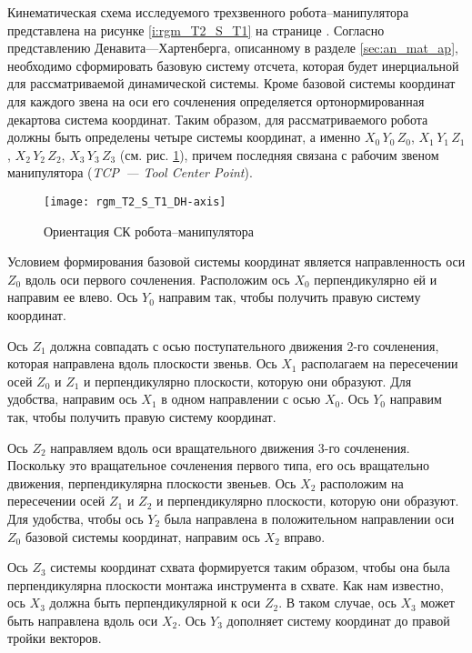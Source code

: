 \documentclass[oneside, final, 14pt]{extarticle}
\begin{document}
Кинематическая схема исследуемого трехзвенного робота--манипулятора представлена на рисунке \ref{i:rgm_T2_S_T1} на странице \pageref{i:rgm_T2_S_T1}.
Согласно представлению Денавита---Хартенберга, описанному в разделе \ref{sec:an_mat_ap}, необходимо сформировать базовую систему отсчета, которая будет инерциальной для рассматриваемой динамической системы.
Кроме базовой системы координат для каждого звена на оси его сочленения определяется ортонормированная декартова система координат.
Таким образом, для рассматриваемого робота должны быть определены четыре системы координат, а именно \(X_0\,Y_0\,Z_0\), \(X_1\,Y_1\,Z_1\), \(X_2\,Y_2\,Z_2\), \(X_3\,Y_3\,Z_3\) (см. рис. \ref{i:rgm_T2_S_T1_DH-axis}), причем последняя связана с рабочим звеном манипулятора ({\itshape TCP~--- Tool Center Point}).
\begin{figure}[h]
  \centering
  \texttt{[image: rgm\_T2\_S\_T1\_DH-axis]}
  \caption{Ориентация СК робота--манипулятора}
  \label{i:rgm_T2_S_T1_DH-axis}
\end{figure}
\par
Условием формирования базовой системы координат является направленность оси \(Z_0\) вдоль оси первого сочленения.
Расположим ось \(X_0\) перпендикулярно ей и направим ее влево.
Ось \(Y_0\) направим так, чтобы получить правую систему координат.
\par
Ось \(Z_1\) должна совпадать с осью поступательного движения 2-го сочленения, которая направлена вдоль плоскости звеньв.
Ось \(X_1\) располагаем на пересечении осей \(Z_0\) и \(Z_1\) и перпендикулярно плоскости, которую они образуют.
Для удобства, направим ось \(X_1\) в одном направлении с осью \(X_0\).
Ось \(Y_0\) направим так, чтобы получить правую систему координат.
\par
Ось \(Z_2\) направляем вдоль оси вращательного движения 3-го сочленения.
Поскольку это вращательное сочленения первого типа, его ось вращательно движения, перпендикулярна плоскости звеньев.
Ось \(X_2\) расположим на пересечении осей \(Z_1\) и \(Z_2\) и перпендикулярно плоскости, которую они образуют.
Для удобства, чтобы ось \(Y_2\) была направлена в положительном направлении оси \(Z_0\) базовой системы координат, направим ось \(X_2\) вправо.
\par
Ось \(Z_3\) системы координат схвата формируется таким образом, чтобы она была перпендикулярна плоскости монтажа инструмента в схвате.
Как нам известно, ось \(X_3\) должна быть перпендикулярной к оси \(Z_2\).
В таком случае, ось \(X_3\) может быть направлена вдоль оси \(X_2\).
Ось \(Y_3\) дополняет систему координат до правой тройки векторов.
\end{document}
